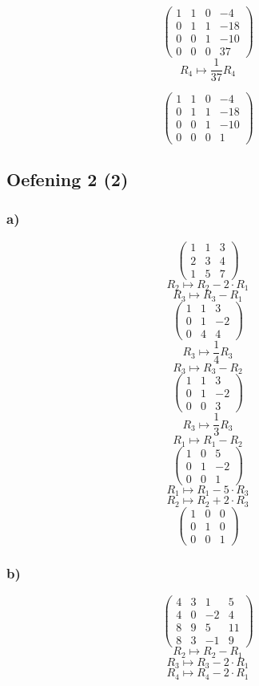 \documentclass[lineaire_algebra_oplossingen.tex]{subfiles}
\begin{document}
$$
\begin{pmatrix}
1 & 1 & 0 & -4\\
0 & 1 & 1 & -18\\
0 & 0 & 1 & -10\\
0 & 0 & 0 & 37
\end{pmatrix}
$$
$$R_4 \longmapsto \frac{1}{37} R_4$$

$$
\begin{pmatrix}
1 & 1 & 0 & -4\\
0 & 1 & 1 & -18\\
0 & 0 & 1 & -10\\
0 & 0 & 0 & 1
\end{pmatrix}
$$
\subsection{Oefening 2 (2)}
\subsubsection*{a)}
\[
\begin{pmatrix}
1 &  1 &  3\\
2 &  3 &  4\\
1 &  5 &  7
\end{pmatrix}
\]
\[ R_2 \longmapsto R_2 -2\cdot R_1\]
\[ R_3 \longmapsto R_3 - R_1\]
\[
\begin{pmatrix}
1 &  1 &  3\\
0 &  1 &  -2\\
0 &  4 &  4
\end{pmatrix}
\]
\[ R_3 \longmapsto \frac{1}{4} R_3\]
\[ R_3 \longmapsto R_3 - R_2\]
\[
\begin{pmatrix}
1 &  1 &  3\\
0 &  1 &  -2\\
0 &  0 &  3
\end{pmatrix}
\]
\[ R_3 \longmapsto \frac{1}{3} R_3\]
\[ R_1 \longmapsto R_1 - R_2\]
\[
\begin{pmatrix}
1 &  0 &  5\\
0 &  1 &  -2\\
0 &  0 &  1
\end{pmatrix}
\]
\[ R_1 \longmapsto R_1 -5\cdot R_3\]
\[ R_2 \longmapsto R_2 +2\cdot R_3\]
\[
\begin{pmatrix}
1 &  0 &  0\\
0 &  1 &  0\\
0 &  0 &  1
\end{pmatrix}
\]
\subsubsection*{b)}
\[
\begin{pmatrix}
4 & 3 & 1 & 5\\
4 & 0 & -2 & 4\\
8 & 9 & 5 & 11\\
8 & 3 & -1 & 9
\end{pmatrix}
\]
\[ R_2 \longmapsto R_2 - R_1 \]
\[ R_3 \longmapsto R_3 - 2\cdot R_1\]
\[ R_4 \longmapsto R_4 - 2\cdot R_1\]
\end{document}
